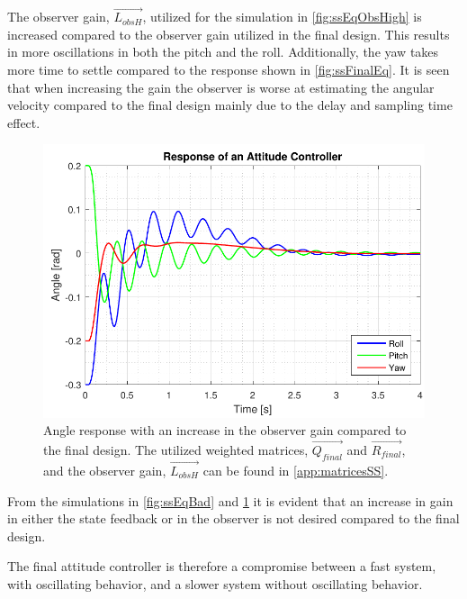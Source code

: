 The observer gain, $\vec{L_{obsH}}$, utilized for the simulation in  \autoref{fig:ssEqObsHigh} is increased compared to the observer gain utilized in the final design. This results in more oscillations in both the pitch and the roll. Additionally, the yaw takes more time to settle compared to the response shown in \autoref{fig:ssFinalEq}. It is seen that when increasing the gain the observer is worse at estimating the angular velocity compared to the final design mainly due to the delay and sampling time effect.
%
\begin{figure}[H]
	\centering
	\includegraphics[scale=0.7]{figures/ssEqObsHigh.pdf}
	\caption{Angle response with an increase in the observer gain compared to the final design. The utilized weighted matrices, $\vec{Q_{final}}$ and $\vec{R_{final}}$, and the observer gain, $\vec{L_{obsH}}$ can be found in \autoref{app:matricesSS}. }
	\label{fig:ssEqObsHigh}
\end{figure}
%
From the simulations in \autoref{fig:ssEqBad} and \ref{fig:ssEqObsHigh} it is evident that an increase in gain in either the state feedback or in the observer is not desired compared to the final design.

The final attitude controller is therefore a compromise between a fast system, with oscillating behavior, and a slower system without oscillating behavior.

